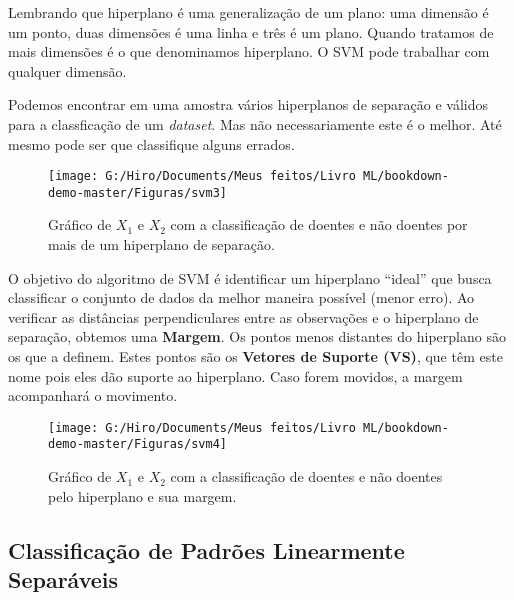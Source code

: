 \documentclass[
]{book}
\begin{document}
Lembrando que hiperplano é uma generalização de um plano: uma dimensão é um ponto, duas dimensões é uma linha e três é um plano. Quando tratamos de mais dimensões é o que denominamos hiperplano. O SVM pode trabalhar com qualquer dimensão.

Podemos encontrar em uma amostra vários hiperplanos de separação e válidos para a classficação de um \emph{dataset}. Mas não necessariamente este é o melhor. Até mesmo pode ser que classifique alguns errados.

\begin{figure}

{\centering \texttt{[image: G:/Hiro/Documents/Meus feitos/Livro ML/bookdown-demo-master/Figuras/svm3]} 

}

\caption{Gráfico de \(X_1\) e \(X_2\) com a classificação de doentes e não doentes por mais de um hiperplano de separação.}\label{fig:svm3}
\end{figure}



O objetivo do algoritmo de SVM é identificar um hiperplano ``ideal'' que busca classificar o conjunto de dados da melhor maneira possível (menor erro). Ao verificar as distâncias perpendiculares entre as observações e o hiperplano de separação, obtemos uma \textbf{Margem}. Os pontos menos distantes do hiperplano são os que a definem. Estes pontos são os \textbf{Vetores de Suporte (VS)}, que têm este nome pois eles dão suporte ao hiperplano. Caso forem movidos, a margem acompanhará o movimento.

\begin{figure}

{\centering \texttt{[image: G:/Hiro/Documents/Meus feitos/Livro ML/bookdown-demo-master/Figuras/svm4]} 

}

\caption{Gráfico de \(X_1\) e \(X_2\) com a classificação de doentes e não doentes pelo hiperplano e sua margem.}\label{fig:svm4}
\end{figure}



\hypertarget{classificauxe7uxe3o-de-padruxf5es-linearmente-separuxe1veis}{%
\subsection{Classificação de Padrões Linearmente Separáveis}\label{classificauxe7uxe3o-de-padruxf5es-linearmente-separuxe1veis}}
\end{document}
